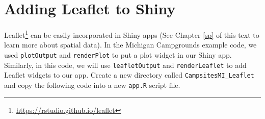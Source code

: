 \documentclass[
]{krantz}
\renewcommand{\href}[2]{#2\footnote{\url{#1}}}
\begin{document}
\hypertarget{adding-leaflet-to-shiny}{%
\section{Adding Leaflet to Shiny}\label{adding-leaflet-to-shiny}}

\href{https://rstudio.github.io/leaflet}{Leaflet} can be easily incorporated in Shiny apps (See Chapter \ref{sp} of this text to learn more about spatial data). In the Michigan Campgrounds example code, we used \texttt{plotOutput} and \texttt{renderPlot} to put a plot widget in our Shiny app. Similarly, in this code, we will use \texttt{leafletOutput} and \texttt{renderLeaflet} to add Leaflet widgets to our app. Create a new directory called \texttt{CampsitesMI\_Leaflet} and copy the following code into a new \texttt{app.R} script file.
\end{document}
